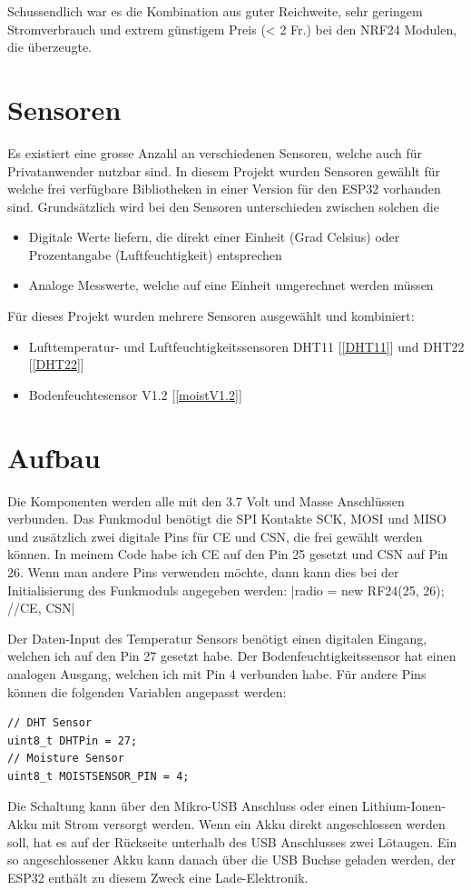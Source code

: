 \documentclass[
  12pt, %
  a4paper, %
  oneside, %
  openany, 
  numbers=noenddot, %
  BCOR=5mm, %
  parskip=half*, %
  thesis, %
]{bfhbook}
\begin{document}
Schussendlich war es die Kombination aus guter Reichweite, sehr geringem Stromverbrauch und extrem günstigem Preis (< 2 Fr.) bei den NRF24 Modulen, die überzeugte.

\section{Sensoren}
 Es existiert eine grosse Anzahl an verschiedenen Sensoren, welche auch für Privatanwender nutzbar sind. In diesem Projekt wurden Sensoren gewählt für welche frei verfügbare Bibliotheken in einer Version für den ESP32 vorhanden sind. Grundsätzlich wird bei den Sensoren unterschieden zwischen solchen die 
 \begin{itemize}
	 \item Digitale Werte liefern, die direkt einer Einheit (Grad Celsius) oder Prozentangabe (Luftfeuchtigkeit) entsprechen
	  \item Analoge Messwerte, welche auf eine Einheit umgerechnet werden müssen
\end{itemize}
Für dieses Projekt wurden mehrere Sensoren ausgewählt und kombiniert:
\begin{itemize}
	\item Lufttemperatur- und Luftfeuchtigkeitssensoren DHT11 [\ref{DHT11}] und DHT22 [\ref{DHT22}]
	\item Bodenfeuchtesensor V1.2 [\ref{moistV1.2}]
\end{itemize}
\section{Aufbau}
Die Komponenten werden alle mit den 3.7 Volt und Masse Anschlüssen verbunden. Das Funkmodul benötigt die SPI Kontakte SCK, MOSI und MISO und zusätzlich zwei digitale Pins für CE und CSN, die frei gewählt werden können. In meinem Code habe ich CE auf den Pin 25 gesetzt und CSN auf Pin 26. Wenn man andere Pins verwenden möchte, dann kann dies bei der Initialisierung des Funkmoduls angegeben werden: |radio = new RF24(25, 26); //CE, CSN|

Der Daten-Input des Temperatur Sensors benötigt einen digitalen Eingang, welchen ich auf den Pin 27 gesetzt habe. Der Bodenfeuchtigkeitssensor hat einen analogen Ausgang, welchen ich mit Pin 4 verbunden habe. Für andere Pins können die folgenden Variablen angepasst werden:
\begin{verbatim}
// DHT Sensor
uint8_t DHTPin = 27;
// Moisture Sensor
uint8_t MOISTSENSOR_PIN = 4;
\end{verbatim}
Die Schaltung kann über den Mikro-USB Anschluss oder einen Lithium-Ionen-Akku mit Strom versorgt werden. Wenn ein Akku direkt angeschlossen werden soll, hat es auf der Rückseite  unterhalb des USB Anschlusses zwei Lötaugen. Ein so angeschlossener Akku kann danach über die USB Buchse geladen werden, der ESP32 enthält zu diesem Zweck eine Lade-Elektronik.
\end{document}
